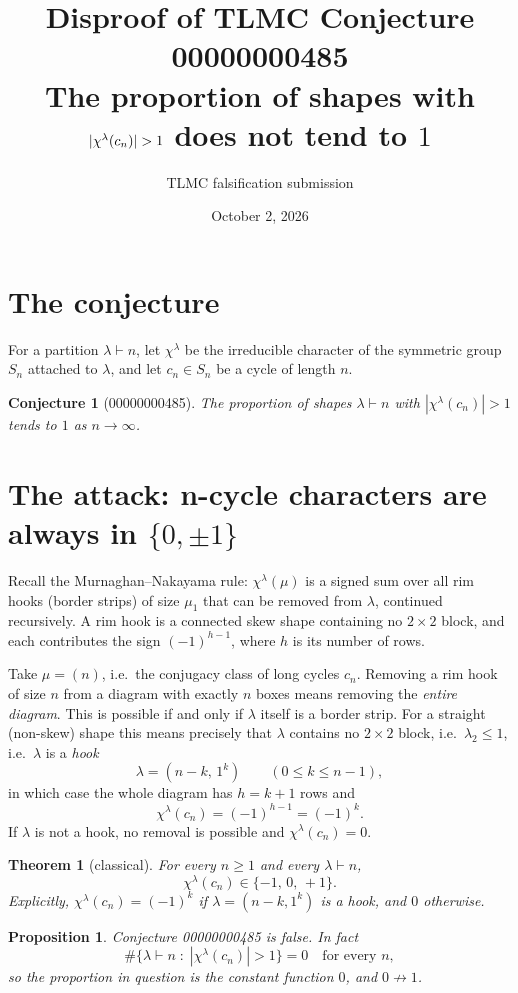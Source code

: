 \documentclass[11pt]{article}
\title{Disproof of TLMC Conjecture 00000000485\\
\large The proportion of shapes with $|\chl(\lc)|>1$ does not tend to $1$}
\author{TLMC falsification submission}
\date{October 2, 2026}
\newcommand{\lc}{c_n}
\newcommand{\chl}{\chi^\lambda}
\newtheorem{conj}{Conjecture}
\newtheorem{prop}{Proposition}
\newtheorem{thm}{Theorem}
\begin{document}
\maketitle

\section{The conjecture}

For a partition $\lambda \vdash n$, let $\chl$ be the irreducible character of
the symmetric group $S_n$ attached to $\lambda$, and let $\lc \in S_n$ be a
cycle of length $n$.

\begin{conj}[00000000485]
The proportion of shapes $\lambda \vdash n$ with $|\chl(\lc)| > 1$ tends to
$1$ as $n \to \infty$.
\end{conj}

\section{The attack: n-cycle characters are always in $\{0,\pm1\}$}

Recall the Murnaghan--Nakayama rule: $\chl(\mu)$ is a signed sum over all rim
hooks (border strips) of size $\mu_1$ that can be removed from $\lambda$,
continued recursively. A rim hook is a connected skew shape containing no
$2\times 2$ block, and each contributes the sign $(-1)^{h-1}$, where $h$ is
its number of rows.

Take $\mu = (n)$, i.e.\ the conjugacy class of long cycles $\lc$. Removing a
rim hook of size $n$ from a diagram with exactly $n$ boxes means removing the
\emph{entire diagram}. This is possible if and only if $\lambda$ itself is a
border strip. For a straight (non-skew) shape this means precisely that
$\lambda$ contains no $2\times 2$ block, i.e.\ $\lambda_2 \le 1$, i.e.\
$\lambda$ is a \emph{hook}
\[
\lambda = (n-k,\, 1^{k}) \qquad (0 \le k \le n-1),
\]
in which case the whole diagram has $h = k+1$ rows and
\[
\chl(\lc) = (-1)^{h-1} = (-1)^{k}.
\]
If $\lambda$ is not a hook, no removal is possible and $\chl(\lc) = 0$.

\begin{thm}[classical]
For every $n \ge 1$ and every $\lambda \vdash n$,
\[
\chl(\lc) \in \{-1,\,0,\,+1\}.
\]
Explicitly, $\chl(\lc) = (-1)^k$ if $\lambda = (n-k,1^k)$ is a hook, and
$0$ otherwise.
\end{thm}

\begin{prop}
Conjecture 00000000485 is false. In fact
\[
\#\{\lambda \vdash n \;:\; |\chl(\lc)| > 1\} = 0 \quad\text{for every } n,
\]
so the proportion in question is the constant function $0$, and
$0 \not\to 1$.
\end{prop}
\end{document}
